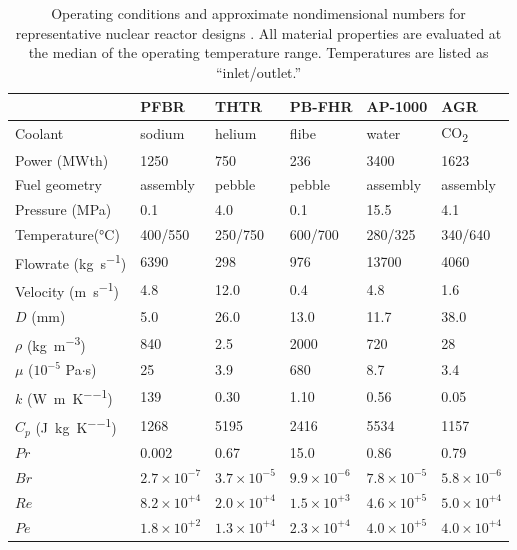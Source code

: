 \begin{table}[!h]
\caption{Operating conditions and approximate nondimensional numbers for representative nuclear reactor designs \cite{pfbr,pfbrTH,thtr_1990,pbfhr,ap1000,ap1000_2,nonbol}. All material properties are evaluated at the median of the operating temperature range. Temperatures are listed as ``inlet/outlet.''}
\centering
\begin{tabular}{|l |l l l l l|}
\hline\hline
 								& PFBR		& THTR 			& PB-FHR 				& AP-1000 			& AGR\Tstrut\Bstrut \\
\hline
 Coolant							& sodium			& helium				& \gls{flibe}				& water				& CO\textsubscript{2}\Tstrut\\
 Power (MWth)				& 1250			& 750				& 236				& 3400				& 1623\\
 Fuel	 geometry							& assembly		& pebble				& pebble				& assembly			& assembly\Bstrut\\
 \hline
Pressure (\si{\mega\pascal})						& 0.1				& 4.0					& 0.1					& 15.5				& 4.1\Tstrut\\
Temperature(\si{\celsius})				& 400/550		& 250/750				& 600/700				& 280/325				& 340/640\\
Flowrate (\si{\kilo\gram\per\second})						& 6390			& 298				& 976				& 13700				& 4060\\
Velocity (\si{\meter\per\second})						& 4.8				& 12.0				& 0.4					& 4.8				& 1.6\Bstrut\\
 \hline
 \(D\) (mm)						& 5.0				& 26.0				& 13.0				& 11.7			& 38.0\Tstrut\\
 \(\rho\) (\si{\kilo\gram\per\cubic\meter})			& 840			& 2.5					& 2000				& 720			& 28\\
 \(\mu\) (\(10^{-5}\) Pa\(\cdot\)s)			& 25				& 3.9					& 680				& 8.7				& 3.4\\
 \(k\) (\si{\watt\per\meter\per\kelvin})					& 139			& 0.30				& 1.10				& 0.56			& 0.05\\
 \(C_p\) (\si{\joule\per\kilo\gram\per\kelvin})				& 1268			& 5195				& 2416				& 5534			& 1157\Bstrut\\
  \hline
 \(Pr\)							& 0.002			& 0.67				& 15.0				& 0.86			& 0.79\Tstrut\\
 \(Br\)							& \(2.7\times10^{-7}\)& \(3.7\times10^{-5}\)	& \(9.9\times10^{-6}\)	& \(7.8\times10^{-5}\)	& \(5.8\times10^{-6}\)\\
 \(Re\)							& \(8.2\times10^{+4}\)	& \(2.0\times10^{+4}\)		& \(1.5\times10^{+3}\)		& \(4.6\times10^{+5}\)		& \(5.0\times10^{+4}\)\\
 \(Pe\)							& \(1.8\times10^{+2}\)	& \(1.3\times10^{+4}\)		& \(2.3\times10^{+4}\)		& \(4.0\times10^{+5}\)		& \(4.0\times10^{+4}\)\\

\end{tabular}
\end{table}
